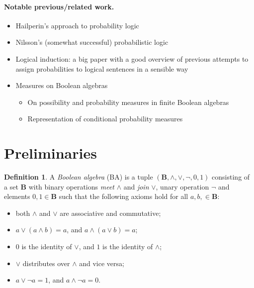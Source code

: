 \documentclass{article}
\theoremstyle{definition}
\newtheorem{definition}[theorem]{Definition}
\theoremstyle{remark}
\begin{document}
\paragraph{Notable previous/related work.}
\begin{itemize}
\item Hailperin's approach to probability logic
  \cite{DBLP:journals/ndjfl/Hailperin84}
\item Nilsson's (somewhat successful) probabilistic logic
  \cite{DBLP:journals/ai/Nilsson86}
\item Logical induction: a big paper with a good overview of previous attempts
  to assign probabilities to logical sentences in a sensible way
  \cite{DBLP:journals/eccc/GarrabrantBCST16}
\item Measures on Boolean algebras
  \begin{itemize}
  \item On possibility and probability measures in finite Boolean algebras
    \cite{DBLP:journals/soco/CastineiraCT02}
  \item Representation of conditional probability measures
    \cite{krauss1968representation}
  \end{itemize}
\end{itemize}

\section{Preliminaries}


\begin{definition} \label{def:ba}
  A \emph{Boolean algebra} (BA) is a tuple $(\mathbf{B}, \land, \lor, \neg, 0,
  1)$ consisting of a set $\mathbf{B}$ with binary operations \emph{meet}
  $\land$ and \emph{join} $\lor$, unary operation $\neg$ and elements $0, 1 \in
  \mathbf{B}$ such that the following axioms hold for all $a, b, \in
  \mathbf{B}$:
  \begin{itemize}
  \item both $\land$ and $\lor$ are associative and commutative;
  \item $a \lor (a \land b) = a$, and $a \land (a \lor b) = a$;
  \item $0$ is the identity of $\lor$, and $1$ is the identity of $\land$;
  \item $\lor$ distributes over $\land$ and vice versa;
  \item $a \lor \neg a = 1$, and $a \land \neg a = 0$.
  \end{itemize}
\end{definition}
\end{document}
